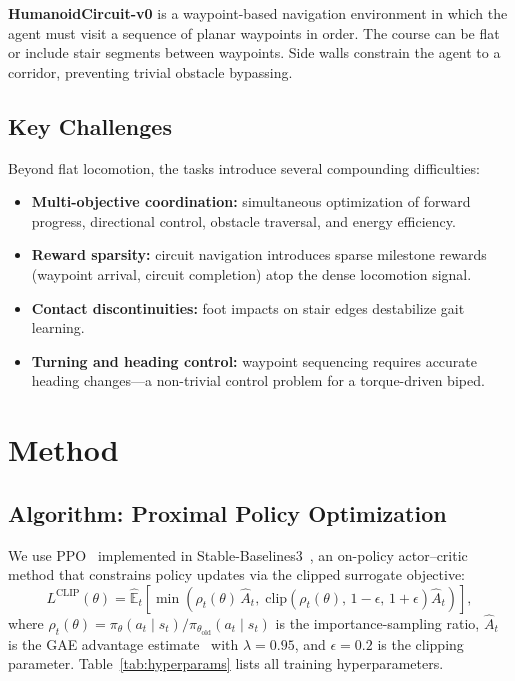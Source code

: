 \documentclass[conference]{IEEEtran}
\begin{document}
\textbf{HumanoidCircuit-v0} is a waypoint-based navigation environment in which the agent must visit a sequence of planar waypoints in order. The course can be flat or include stair segments between waypoints. Side walls constrain the agent to a corridor, preventing trivial obstacle bypassing.

\subsection{Key Challenges}

Beyond flat locomotion, the tasks introduce several compounding difficulties:
\begin{itemize}
    \item \textbf{Multi-objective coordination:} simultaneous optimization of forward progress, directional control, obstacle traversal, and energy efficiency.
    \item \textbf{Reward sparsity:} circuit navigation introduces sparse milestone rewards (waypoint arrival, circuit completion) atop the dense locomotion signal.
    \item \textbf{Contact discontinuities:} foot impacts on stair edges destabilize gait learning.
    \item \textbf{Turning and heading control:} waypoint sequencing requires accurate heading changes---a non-trivial control problem for a torque-driven biped.
\end{itemize}



\section{Method}
\label{sec:method}

\subsection{Algorithm: Proximal Policy Optimization}
\label{sec:ppo}

We use PPO~\cite{schulman2017ppo} implemented in Stable-Baselines3~\cite{raffin2021sb3}, an on-policy actor--critic method that constrains policy updates via the clipped surrogate objective:
\begin{equation}
\label{eq:ppo}
L^{\mathrm{CLIP}}(\theta) = \hat{\mathbb{E}}_t \!\left[ \min\!\left( \rho_t(\theta)\,\hat{A}_t,\; \mathrm{clip}\!\left(\rho_t(\theta),\, 1{-}\epsilon,\, 1{+}\epsilon\right)\hat{A}_t \right) \right],
\end{equation}
where $\rho_t(\theta) = \pi_\theta(a_t \mid s_t) / \pi_{\theta_{\mathrm{old}}}(a_t \mid s_t)$ is the importance-sampling ratio, $\hat{A}_t$ is the GAE advantage estimate~\cite{schulman2017ppo} with $\lambda = 0.95$, and $\epsilon = 0.2$ is the clipping parameter. Table~\ref{tab:hyperparams} lists all training hyperparameters.
\end{document}
